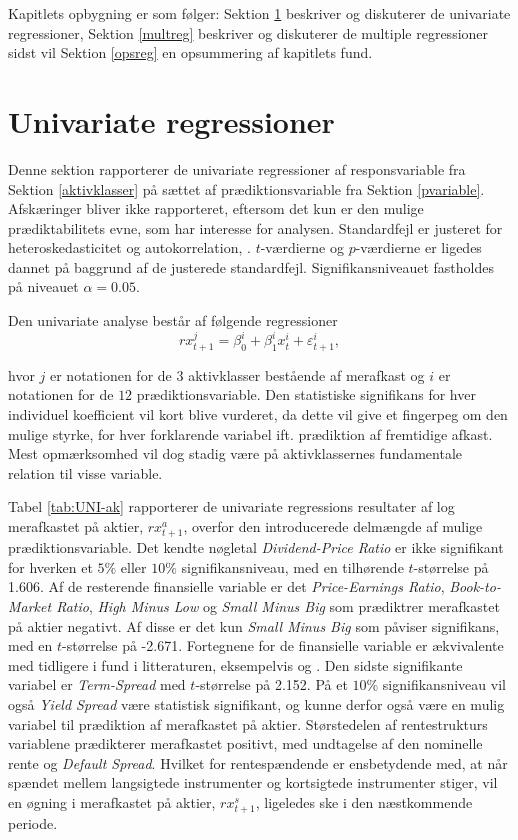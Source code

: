 \documentclass[
  a4paper,
  oneside]{memoir}
\begin{document}
Kapitlets opbygning er som følger: Sektion \ref{unireg} beskriver og diskuterer de univariate regressioner, Sektion \ref{multreg} beskriver og diskuterer de multiple regressioner sidst vil Sektion \ref{opsreg} en opsummering af kapitlets fund.

\hypertarget{unireg}{%
\section{Univariate regressioner}\label{unireg}}

Denne sektion rapporterer de univariate regressioner af responsvariable fra Sektion \ref{aktivklasser} på sættet af prædiktionsvariable fra Sektion \ref{pvariable}. Afskæringer bliver ikke rapporteret, eftersom det kun er den mulige prædiktabilitets evne, som har interesse for analysen. Standardfejl er justeret for heteroskedasticitet og autokorrelation, \citep{Newey1987}. \(t\)-værdierne og \(p\)-værdierne er ligedes dannet på baggrund af de justerede standardfejl. Signifikansniveauet fastholdes på niveauet \(\alpha=0.05\).

Den univariate analyse består af følgende regressioner
\[rx_{t+1}^j=\beta_{0}^i+\beta_{1}^ix_{t}^i+\varepsilon_{t+1}^i,\]

hvor \(j\) er notationen for de \(3\) aktivklasser bestående af merafkast og \(i\) er notationen for de \(12\) prædiktionsvariable. Den statistiske signifikans for hver individuel koefficient vil kort blive vurderet, da dette vil give et fingerpeg om den mulige styrke, for hver forklarende variabel ift. prædiktion af fremtidige afkast. Mest opmærksomhed vil dog stadig være på aktivklassernes fundamentale relation til visse variable.

Tabel \ref{tab:UNI-ak} rapporterer de univariate regressions resultater af log merafkastet på aktier, \(rx_{t+1}^a\), overfor den introducerede delmængde af mulige prædiktionsvariable. Det kendte nøgletal \emph{Dividend-Price Ratio} er ikke signifikant for hverken et \(5\%\) eller \(10\%\) signifikansniveau, med en tilhørende \(t\)-størrelse på 1.606. Af de resterende finansielle variable er det \emph{Price-Earnings Ratio}, \emph{Book-to-Market Ratio}, \emph{High Minus Low} og \emph{Small Minus Big} som prædiktrer merafkastet på aktier negativt. Af disse er det kun \emph{Small Minus Big} som påviser signifikans, med en \(t\)-størrelse på -2.671. Fortegnene for de finansielle variable er ækvivalente med tidligere i fund i litteraturen, eksempelvis \citep{Camp1987} og \citep{CampVicCha2003}. Den sidste signifikante variabel er \emph{Term-Spread} med \(t\)-størrelse på 2.152. På et \(10\%\) signifikansniveau vil også \emph{Yield Spread} være statistisk signifikant, og kunne derfor også være en mulig variabel til prædiktion af merafkastet på aktier. Størstedelen af rentestrukturs variablene prædikterer merafkastet positivt, med undtagelse af den nominelle rente og \emph{Default Spread}. Hvilket for rentespændende er ensbetydende med, at når spændet mellem langsigtede instrumenter og kortsigtede instrumenter stiger, vil en øgning i merafkastet på aktier, \(rx_{t+1}^s\), ligeledes ske i den næstkommende periode.
\end{document}
